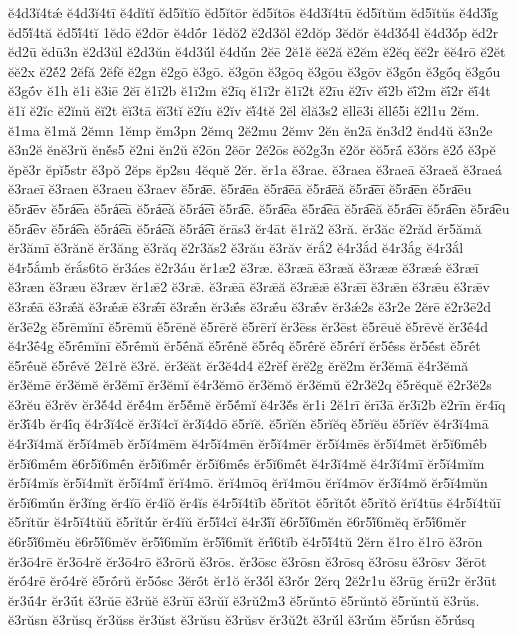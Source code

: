 {ĕ4d3ĭ4tǽ
ĕ4d3ĭ4tī
ĕ4dĭtĭ
ĕd5ĭtĭō
ĕd5ĭtōr
ĕd5ĭtōs
ĕ4d3ĭ4tū
ĕd5ĭtŭm
ĕd5ĭtŭs
ĕ4d3ĭ́g
ĕd5ĭ́4tă
ĕd5ĭ́4tĭ
1ĕdō
ĕ2dōr
ĕ4dṓr
1ĕdŏ2
ĕ2d3ŏl
ĕ2dŏp
3ĕdŏr
ĕ4d3ŏ́4l
ĕ4d3ŏ́p
ĕd2r
ĕd2ū
ĕdū3n
ĕ2d3ŭl
ĕ2d3ŭn
ĕ4d3ŭ́l
ĕ4dŭ́n
2ĕē
2ĕ1ĕ
ĕĕ2ă
ĕ2ĕm
ĕ2ĕq
ĕĕ2r
ĕĕ4rō
ĕ2ĕt
ĕĕ2x
ĕ2ĕ́2
2ĕfă
2ĕfĕ
ĕ2gn
ĕ2gō
ĕ3gō.
ĕ3gōn
ĕ3gōq
ĕ3gōu
ĕ3gōv
ĕ3gṓn
ĕ3gṓq
ĕ3gṓu
ĕ3gṓv
ĕ1h
ĕ1i
ĕ3iē
2ĕī
ĕ1ī2b
ĕ1ī2m
ĕ2īq
ĕ1ī2r
ĕ1ī2t
ĕ2īu
ĕ2īv
ĕī́2b
ĕī́2m
ĕī́2r
ĕī́4t
ĕ1ĭ
ĕ2ĭc
ĕ2ĭnŭ
ĕĭ2t
ĕĭ3tā
ĕĭ3tĭ
ĕ2ĭu
ĕ2ĭv
ĕĭ́4tĕ
2ĕl
ĕlă3s2
ĕllē3i
ĕllḗ5i
ĕ2l1u
2ĕm.
ĕ1ma
ĕ1mă
2ĕmn
1ĕmp
ĕm3pn
2ĕmq
2ĕ2mu
2ĕmv
2ĕn
ĕn2ā
ĕn3d2
ĕnd4ŭ
ĕ3n2e
ĕ3n2ĕ
ĕnĕ3rŭ
ĕnĕ́s5
ĕ2ni
ĕn2ŭ
ĕ2ōn
2ĕōr
2ĕ2ōs
ĕŏ2g3n
ĕ2ŏr
ĕŏ5rā́
ĕ3ŏrs
ĕ2ŏ́
ĕ3pĕ
ĕpĕ3r
ĕpĭ5str
ĕ3pŏ
2ĕps
ĕp2su
4ĕquĕ
2ĕr.
ĕr1a
ĕ3rae.
ĕ3raea
ĕ3raeā
ĕ3raeă
ĕ3raeá
ĕ3raeī
ĕ3raen
ĕ3raeu
ĕ3raev
ĕ5ra͞e.
ĕ5ra͞ea
ĕ5ra͞eā
ĕ5ra͞eă
ĕ5ra͞eī
ĕ5ra͞en
ĕ5ra͞eu
ĕ5ra͞ev
ĕ5rá͞ea
ĕ5rá͞eā
ĕ5rá͞eă
ĕ5rá͞eī
ĕ5ra͡e.
ĕ5ra͡ea
ĕ5ra͡eā
ĕ5ra͡eă
ĕ5ra͡eī
ĕ5ra͡en
ĕ5ra͡eu
ĕ5ra͡ev
ĕ5rá͡ea
ĕ5rá͡eā
ĕ5rá͡eă
ĕ5rá͡eī
ĕrās3
ĕr4āt
ĕ1ră2
ĕ3ră.
ĕr3ăc
ĕ2răd
ĕr5ămă
ĕr3ămī
ĕ3rănĕ
ĕr3ăng
ĕ3răq
ĕ2r3ăs2
ĕ3rău
ĕ3răv
ĕrắ2
ĕ4r3ắd
ĕ4r3ắg
ĕ4r3ắl
ĕ4r5ắmb
ĕrắs6tō
ĕr3áes
ĕ2r3áu
ĕr1æ2
ĕ3ræ.
ĕ3ræā
ĕ3ræă
ĕ3rææ
ĕ3ræǽ
ĕ3ræī
ĕ3ræn
ĕ3ræu
ĕ3ræv
ĕr1ǣ2
ĕ3rǣ.
ĕ3rǣā
ĕ3rǣă
ĕ3rǣǣ
ĕ3rǣī
ĕ3rǣn
ĕ3rǣu
ĕ3rǣv
ĕ3rǣ́ā
ĕ3rǣ́ă
ĕ3rǣ́ǣ
ĕ3rǣ́ī
ĕ3rǣ́n
ĕr3ǣ́s
ĕ3rǣ́u
ĕ3rǣ́v
ĕr3ǽ2s
ĕ3r2e
2ĕrē
ĕ2r3ē2d
ĕr3ē2g
ĕ5rēmĭnī
ĕ5rēmŭ
ĕ5rēnĕ
ĕ5rērĕ
ĕ5rērĭ
ĕr3ēss
ĕr3ēst
ĕ5rēuĕ
ĕ5rēvĕ
ĕr3ḗ4d
ĕ4r3ḗ4g
ĕ5rḗmĭnī
ĕ5rḗmŭ
ĕr5ḗnă
ĕ5rḗnĕ
ĕ5rḗq
ĕ5rḗrĕ
ĕ5rḗrĭ
ĕr5ḗss
ĕr5ḗst
ĕ5rḗt
ĕ5rḗuĕ
ĕ5rḗvĕ
2ĕ1rĕ
ĕ3rĕ.
ĕr3ĕăt
ĕr3ĕ4d4
ĕ2rĕf
ĕrĕ2g
ĕrĕ2m
ĕr3ĕmā
ĕ4r3ĕmă
ĕr3ĕmē
ĕr3ĕmĕ
ĕr3ĕmī
ĕr3ĕmĭ
ĕ4r3ĕmō
ĕr3ĕmŏ
ĕr3ĕmŭ
ĕ2r3ĕ2q
ĕ5rĕquĕ
ĕ2r3ĕ2s
ĕ3rĕu
ĕ3rĕv
ĕr3ĕ́4d
ĕrĕ́4m
ĕr5ĕ́mĕ
ĕr5ĕ́mĭ
ĕ4r3ĕ́s
ĕr1i
2ĕ1rī
ĕrī3ā
ĕr3ī2b
ĕ2rīn
ĕr4īq
ĕr3ī́4b
ĕr4ī́q
ĕ4r3ĭ4cĕ
ĕr3ĭ4cĭ
ĕr3ĭ4dō
ĕ5rĭĕ.
ĕ5rĭĕn
ĕ5rĭĕq
ĕ5rĭĕu
ĕ5rĭĕv
ĕ4r3ĭ4mā
ĕ4r3ĭ4mă
ĕr5ĭ4mēb
ĕr5ĭ4mēm
ĕ4r5ĭ4mēn
ĕr5ĭ4mēr
ĕr5ĭ4mēs
ĕr5ĭ4mēt
ĕr5ĭ6mḗb
ĕr5ĭ6mḗm
ĕ6r5ĭ6mḗn
ĕr5ĭ6mḗr
ĕr5ĭ6mḗs
ĕr5ĭ6mḗt
ĕ4r3ĭ4mĕ
ĕ4r3ĭ4mī
ĕr5ĭ4mĭm
ĕr5ĭ4mĭs
ĕr5ĭ4mĭt
ĕr5ĭ4mĭ́
ĕrĭ4mō.
ĕrĭ4mōq
ĕrĭ4mōu
ĕrĭ4mōv
ĕr3ĭ4mŏ
ĕr5ĭ4mŭn
ĕr5ĭ6mŭ́n
ĕr3ĭng
ĕr4ĭō
ĕr4ĭŏ
ĕr4ĭs
ĕ4r5ĭ4tĭb
ĕ5rĭtōt
ĕ5rĭtṓt
ĕ5rĭtŏ
ĕrĭ4tūs
ĕ4r5ĭ4tŭī
ĕ5rĭtŭr
ĕ4r5ĭ4tŭŭ
ĕ5rĭtŭ́r
ĕr4ĭŭ
ĕr5ĭ́4cĭ
ĕ4r3ĭ́ĭ
ĕ6r5ĭ́6mĕn
ĕ6r5ĭ́6mĕq
ĕr5ĭ́6mĕr
ĕ6r5ĭ́6mĕu
ĕ6r5ĭ́6mĕv
ĕr5ĭ́6mĭm
ĕr5ĭ́6mĭt
ĕrĭ́6tĭb
ĕ4r5ĭ́4tŭ
2ĕrn
ĕ1ro
ĕ1rō
ĕ3rōn
ĕr3ō4rē
ĕr3ō4rĕ
ĕr3ō4rō
ĕ3rōrŭ
ĕ3rōs.
ĕr3ōsc
ĕ3rōsn
ĕ3rōsq
ĕ3rōsu
ĕ3rōsv
3ĕrōt
ĕrṓ4rē
ĕrṓ4rĕ
ĕ5rṓrŭ
ĕr5ṓsc
3ĕrṓt
ĕr1ŏ
ĕr3ŏ́l
ĕ3rŏ́r
2ĕrq
2ĕ2r1u
ĕ3rūg
ĕrū2r
ĕr3ūt
ĕr3ū́4r
ĕr3ū́t
ĕ3rŭē
ĕ3rŭĕ
ĕ3rŭī
ĕ3rŭĭ
ĕ3rŭ2m3
ĕ5rŭntō
ĕ5rŭntŏ
ĕ5rŭntŭ
ĕ3rŭs.
ĕ3rŭsn
ĕ3rŭsq
ĕr3ŭss
ĕr3ŭst
ĕ3rŭsu
ĕ3rŭsv
ĕr3ŭ2t
ĕ3rŭ́l
ĕ3rŭ́m
ĕ5rŭ́sn
ĕ5rŭ́sq
}
